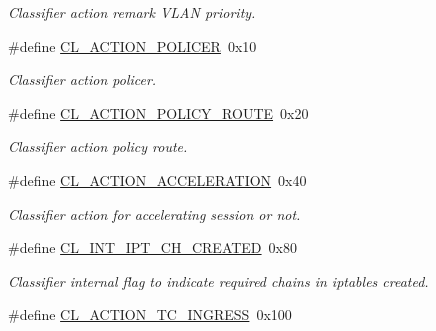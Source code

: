 \begin{DoxyCompactItemize}
\begin{DoxyCompactList}\small\item\em Classifier action remark V\-L\-A\-N priority. \end{DoxyCompactList}\item 
\hypertarget{group__FAPI__QOS__QUEUE_gaeb02670f38dbe11bb37a20b43404aa2f}{\#define \hyperlink{group__FAPI__QOS__QUEUE_gaeb02670f38dbe11bb37a20b43404aa2f}{C\-L\-\_\-\-A\-C\-T\-I\-O\-N\-\_\-\-P\-O\-L\-I\-C\-E\-R}~0x10}\label{group__FAPI__QOS__QUEUE_gaeb02670f38dbe11bb37a20b43404aa2f}

\begin{DoxyCompactList}\small\item\em Classifier action policer. \end{DoxyCompactList}\item 
\hypertarget{group__FAPI__QOS__QUEUE_ga6142d956017289f4fba2b8474a8590ae}{\#define \hyperlink{group__FAPI__QOS__QUEUE_ga6142d956017289f4fba2b8474a8590ae}{C\-L\-\_\-\-A\-C\-T\-I\-O\-N\-\_\-\-P\-O\-L\-I\-C\-Y\-\_\-\-R\-O\-U\-T\-E}~0x20}\label{group__FAPI__QOS__QUEUE_ga6142d956017289f4fba2b8474a8590ae}

\begin{DoxyCompactList}\small\item\em Classifier action policy route. \end{DoxyCompactList}\item 
\hypertarget{group__FAPI__QOS__QUEUE_gab3a5eba054b613a8625f8ba2a1ff0b3d}{\#define \hyperlink{group__FAPI__QOS__QUEUE_gab3a5eba054b613a8625f8ba2a1ff0b3d}{C\-L\-\_\-\-A\-C\-T\-I\-O\-N\-\_\-\-A\-C\-C\-E\-L\-E\-R\-A\-T\-I\-O\-N}~0x40}\label{group__FAPI__QOS__QUEUE_gab3a5eba054b613a8625f8ba2a1ff0b3d}

\begin{DoxyCompactList}\small\item\em Classifier action for accelerating session or not. \end{DoxyCompactList}\item 
\hypertarget{group__FAPI__QOS__QUEUE_gad1a39bca2eca8c238c322b1f277e79ce}{\#define \hyperlink{group__FAPI__QOS__QUEUE_gad1a39bca2eca8c238c322b1f277e79ce}{C\-L\-\_\-\-I\-N\-T\-\_\-\-I\-P\-T\-\_\-\-C\-H\-\_\-\-C\-R\-E\-A\-T\-E\-D}~0x80}\label{group__FAPI__QOS__QUEUE_gad1a39bca2eca8c238c322b1f277e79ce}

\begin{DoxyCompactList}\small\item\em Classifier internal flag to indicate required chains in iptables created. \end{DoxyCompactList}\item 
\hypertarget{group__FAPI__QOS__QUEUE_gace2d4f3d52f545638f8a3149e98c82fc}{\#define \hyperlink{group__FAPI__QOS__QUEUE_gace2d4f3d52f545638f8a3149e98c82fc}{C\-L\-\_\-\-A\-C\-T\-I\-O\-N\-\_\-\-T\-C\-\_\-\-I\-N\-G\-R\-E\-S\-S}~0x100}\label{group__FAPI__QOS__QUEUE_gace2d4f3d52f545638f8a3149e98c82fc}


\end{DoxyCompactItemize}
